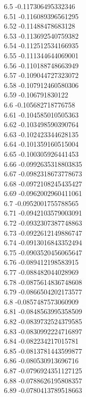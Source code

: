 {6.5	-0.117306495332346\\
6.51	-0.116089396561295\\
6.52	-0.11488478683128\\
6.53	-0.113692540759382\\
6.54	-0.112512534166935\\
6.55	-0.111344644069001\\
6.56	-0.110188748663949\\
6.57	-0.109044727323072\\
6.58	-0.107912460580306\\
6.59	-0.106791830122\\
6.6	-0.105682718776758\\
6.61	-0.104585010505363\\
6.62	-0.103498590390764\\
6.63	-0.102423344628135\\
6.64	-0.101359160515004\\
6.65	-0.100305926441453\\
6.66	-0.0992635318803835\\
6.67	-0.0982318673778673\\
6.68	-0.0972108245435427\\
6.69	-0.0962002960411061\\
6.7	-0.0952001755788565\\
6.71	-0.0942103579003091\\
6.72	-0.0932307387748863\\
6.73	-0.0922612149886747\\
6.74	-0.0913016843352494\\
6.75	-0.0903520456065647\\
6.76	-0.089412198583915\\
6.77	-0.088482044028969\\
6.78	-0.0875614836748608\\
6.79	-0.0866504202173577\\
6.8	-0.0857487573060909\\
6.81	-0.0848563995358509\\
6.82	-0.0839732524379585\\
6.83	-0.0830992224716897\\
6.84	-0.082234217015781\\
6.85	-0.0813781443599877\\
6.86	-0.080530913696716\\
6.87	-0.0796924351127125\\
6.88	-0.0788626195808357\\
6.89	-0.0780413789518663\\
}
